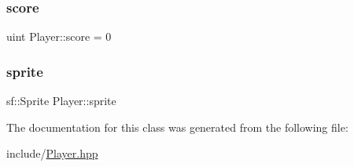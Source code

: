 \subsubsection{\texorpdfstring{score}{score}}
{\footnotesize\ttfamily uint Player\+::score = 0\hspace{0.3cm}{\ttfamily [private]}}

\mbox{\label{class_player_a19bc8731e5e84613a2ae7c4b5134dfab}} 
\subsubsection{\texorpdfstring{sprite}{sprite}}
{\footnotesize\ttfamily sf\+::\+Sprite Player\+::sprite\hspace{0.3cm}{\ttfamily [private]}}



The documentation for this class was generated from the following file\+:\begin{DoxyCompactItemize}
\item 
include/\mbox{\hyperlink{_player_8hpp}{Player.\+hpp}}\end{DoxyCompactItemize}
